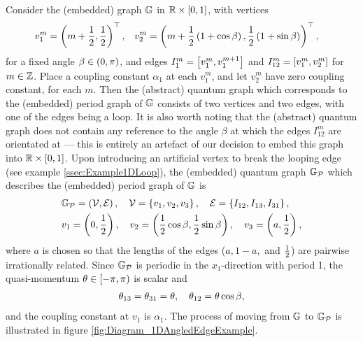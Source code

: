 Consider the (embedded) graph $\mathbb{G}$ in $\mathbb{R}\times\left[ 0,1 \right]$, with vertices
\begin{align*}
	v_1^m = \left( m + \frac{1}{2}, \frac{1}{2} \right)^\top, 
	&\quad v_2^m = \left( m + \frac{1}{2}\left( 1+\cos\beta \right), \frac{1}{2}\left( 1+\sin\beta \right) \right)^\top,
\end{align*}
for a fixed angle $\beta\in\left( 0,\pi \right)$, and edges $I_{1}^{m} = \left[ v_1^m, v_1^{m+1} \right]$ and $I_{12}^m=\left[ v_1^m, v_2^m \right]$ for $m\in\mathbb{Z}$.
Place a coupling constant $\alpha_1$ at each $v_1^m$, and let $v_2^m$ have zero coupling constant, for each $m$.
Then the (abstract) quantum graph which corresponds to the (embedded) period graph of $\mathbb{G}$ consists of two vertices and two edges, with one of the edges being a loop.
It is also worth noting that the (abstract) quantum graph does not contain any reference to the angle $\beta$ at which the edges $I^m_{12}$ are orientated at --- this is entirely an artefact of our decision to embed this graph into $\mathbb{R}\times\left[ 0,1 \right]$.
Upon introducing an artificial vertex to break the looping edge (see example \ref{ssec:Example1DLoop}), the (embedded) quantum graph $\mathbb{G}_{\mathcal{P}}$ which describes the (embedded) period graph of $\mathbb{G}$ is
\begin{align*}
	&\mathbb{G}_{\mathcal{P}} = \left( \mathcal{V}, \mathcal{E} \right), \quad
	\mathcal{V} = \left\{  v_1, v_2, v_3  \right\}, \quad
	\mathcal{E} = \left\{  I_{12}, I_{13}, I_{31}  \right\}, \\
	&v_1 = \left( 0,\frac{1}{2} \right), \quad
	v_2 = \left( \frac{1}{2}\cos\beta, \frac{1}{2}\sin\beta \right), \quad
	v_3 = \left( a, \frac{1}{2} \right),
\end{align*}
where $a$ is chosen so that the lengths of the edges ($a, 1-a,$ and $\frac{1}{2}$) are pairwise irrationally related.
Since $\mathbb{G}_{\mathcal{P}}$ is periodic in the $x_1$-direction with period 1, the quasi-momentum $\theta\in\left[-\pi,\pi\right)$ is scalar and
\begin{align*}
	\theta_{13} = \theta_{31} = \theta, \quad \theta_{12} = \theta\cos\beta,
\end{align*}
and the coupling constant at $v_1$ is $\alpha_1$. 
The process of moving from $\mathbb{G}$ to $\mathbb{G}_{\mathcal{P}}$ is illustrated in figure \ref{fig:Diagram_1DAngledEdgeExample}.
